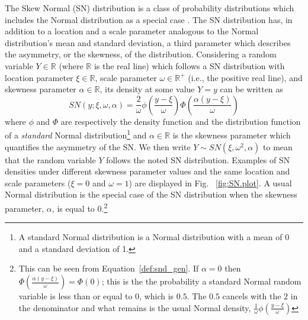 \documentclass[11pt, oneside]{article}
\begin{document}
The Skew Normal (SN) distribution is a class of probability distributions which includes the Normal distribution as a special case \citep{Azzalini1985}. The SN distribution has, in addition to a location and a scale parameter analogous to the Normal distribution's mean and standard deviation, a third parameter which describes the asymmetry, or the skewness, of the distribution. Considering a random variable $Y\in \mathbb R$ (where $\mathbb R$ is the real line) which follows a SN distribution with location parameter $\xi \in \mathbb R$, scale parameter $\omega \in \mathbb R^{+}$ (i.e., the positive real line), and skewness parameter $\alpha \in \mathbb R$, its density at some value $Y = y$ can be written as 
\begin{equation} \label{def:snd_gen}
SN(y;\xi, \omega, \alpha) = \frac{2}{\omega} \phi\left(\frac{y-\xi}{\omega}\right) \Phi\left(\frac{\alpha(y-\xi)}{\omega}\right)
\end{equation}
where $\phi$ and $\Phi$ are respectively the density function and the distribution function of a \emph{standard} Normal distribution\footnote{A standard Normal distribution is a Normal distribution with a mean of 0 and a standard deviation of 1.}
 and $\alpha \in \mathbb R$ is the skewness parameter which quantifies the asymmetry of the SN.  We then write $Y \sim SN(\xi, \omega^{2}, \alpha)$ to mean that the random variable $Y$ follows the noted SN distribution.
Examples of SN densities under different skewness parameter values and the same location and scale parameters ($\xi = 0$ and $\omega = 1$) are displayed in Fig.~ \ref{fig:SN.plot}.  A usual Normal distribution is the special case of the SN distribution when the skewness parameter, $\alpha$, is equal to 0.\footnote{This can be seen from Equation~\eqref{def:snd_gen}.  If $\alpha = 0$ then $\Phi\left(\frac{\alpha(y-\xi)}{\omega}\right) = \Phi(0)$; this is the the probability a standard Normal random variable is less than or equal to 0, which is $0.5$.  The $0.5$ cancels with the $2$ in the denominator and what remains is the usual Normal density, $\frac{1}{\omega} \phi\left(\frac{y-\xi}{\omega}\right)$}
%
\end{document}
